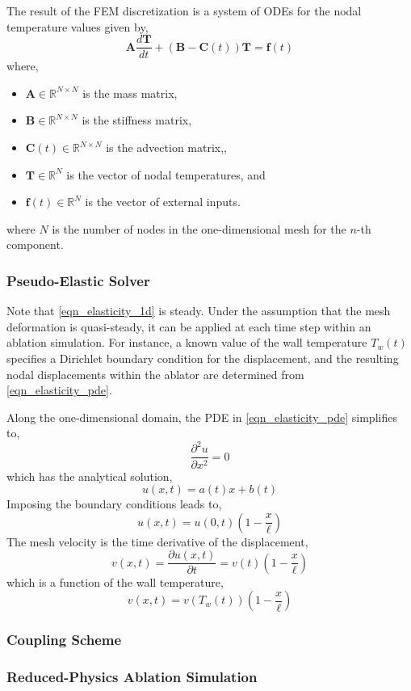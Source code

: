 The result of the FEM discretization is a system of ODEs for the nodal temperature values given by,
\begin{equation}
    \mathbf{A}\frac{d\mathbf{T}}{dt} + \left(\mathbf{B} - \mathbf{C}(t)\right)\mathbf{T} = \mathbf{f}(t)
\end{equation}
where,
\begin{itemize}
    \item $\mathbf{A}\in\mathbb{R}^{N\times N}$ is the mass matrix,
    \item $\mathbf{B}\in\mathbb{R}^{N\times N}$ is the stiffness matrix,
    \item $\mathbf{C}(t)\in\mathbb{R}^{N\times N}$ is the advection matrix,,
    \item $\mathbf{T}\in\mathbb{R}^{N}$ is the vector of nodal temperatures, and
    \item $\mathbf{f}(t)\in\mathbb{R}^{N}$ is the vector of external inputs.
\end{itemize}
where $N$ is the number of nodes in the one-dimensional mesh for the $n$-th component.


\subsubsection{Pseudo-Elastic Solver}

Note that \cref{eqn_elasticity_1d} is steady. Under the assumption that the mesh deformation is quasi-steady, it can be applied at each time step within an ablation simulation. For instance, a known value of the wall temperature $T_w(t)$ specifies a Dirichlet boundary condition for the displacement, and the resulting nodal displacements within the ablator are determined from \cref{eqn_elasticity_pde}.

Along the one-dimensional domain, the PDE in \cref{eqn_elasticity_pde} simplifies to,
\begin{equation}
    \frac{\partial^2 u}{\partial x^2} = 0
\end{equation}
which has the analytical solution,
\begin{equation}
    u(x,t) = a(t)x + b(t)
\end{equation}
Imposing the boundary conditions leads to,
\begin{equation}
    u(x,t) = u(0,t)\left(1 - \frac{x}{\ell}\right)
\end{equation}
The mesh velocity is the time derivative of the displacement,
\begin{equation}
    v(x,t) = \frac{\partial u(x,t)}{\partial t} = v(t)\left(1 - \frac{x}{\ell}\right)
\end{equation}
which is a function of the wall temperature,
\begin{equation}
    v(x,t) = v(T_w(t)) \left(1 - \frac{x}{\ell}\right)
\end{equation}

\subsubsection{Coupling Scheme}

\subsubsection{Reduced-Physics Ablation Simulation}







